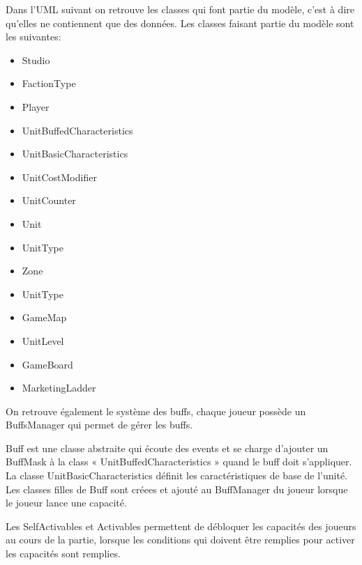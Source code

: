 Dans l'UML suivant on retrouve les classes qui font partie du modèle, c'est à
dire qu'elles ne contiennent que des données.
Les classes faisant partie du modèle sont les suivantes:
\begin{itemize}
    \item Studio
    \item FactionType
    \item Player
    \item UnitBuffedCharacteristics
    \item UnitBasicCharacteristics
    \item UnitCostModifier
    \item UnitCounter
    \item Unit
    \item UnitType
    \item Zone
    \item UnitType
    \item GameMap
    \item UnitLevel
    \item GameBoard
    \item MarketingLadder
\end{itemize}

On retrouve également le système des buffs, chaque joueur possède un
BuffsManager qui permet de gérer les buffs.

Buff est une classe abstraite qui écoute des events et se charge d'ajouter un
BuffMask à la class « UnitBuffedCharacteristics » quand le buff doit
s'appliquer.
La classe UnitBasicCharacteristics définit les caractéristiques de base de l'unité.
Les classes filles de Buff sont créees et ajouté au BuffManager du
joueur lorsque le joueur lance une capacité.

Les SelfActivables et Activables permettent de débloquer les capacités des
joueurs au cours de la partie, lorsque les conditions qui doivent être remplies
pour activer les capacités sont remplies.



